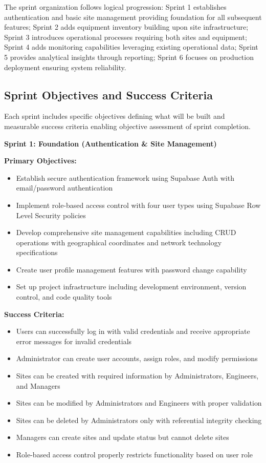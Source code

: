 The sprint organization follows logical progression: Sprint 1 establishes authentication and basic site management providing foundation for all subsequent features; Sprint 2 adds equipment inventory building upon site infrastructure; Sprint 3 introduces operational processes requiring both sites and equipment; Sprint 4 adds monitoring capabilities leveraging existing operational data; Sprint 5 provides analytical insights through reporting; Sprint 6 focuses on production deployment ensuring system reliability.

\subsection{Sprint Objectives and Success Criteria}

Each sprint includes specific objectives defining what will be built and measurable success criteria enabling objective assessment of sprint completion.

\textbf{Sprint 1: Foundation (Authentication \& Site Management)}

\textbf{Primary Objectives:}
\begin{itemize}
\item Establish secure authentication framework using Supabase Auth with email/password authentication
\item Implement role-based access control with four user types using Supabase Row Level Security policies
\item Develop comprehensive site management capabilities including CRUD operations with geographical coordinates and network technology specifications
\item Create user profile management features with password change capability
\item Set up project infrastructure including development environment, version control, and code quality tools
\end{itemize}

\textbf{Success Criteria:}
\begin{itemize}
\item Users can successfully log in with valid credentials and receive appropriate error messages for invalid credentials
\item Administrator can create user accounts, assign roles, and modify permissions
\item Sites can be created with required information by Administrators, Engineers, and Managers
\item Sites can be modified by Administrators and Engineers with proper validation
\item Sites can be deleted by Administrators only with referential integrity checking
\item Managers can create sites and update status but cannot delete sites
\item Role-based access control properly restricts functionality based on user role
\end{itemize}

